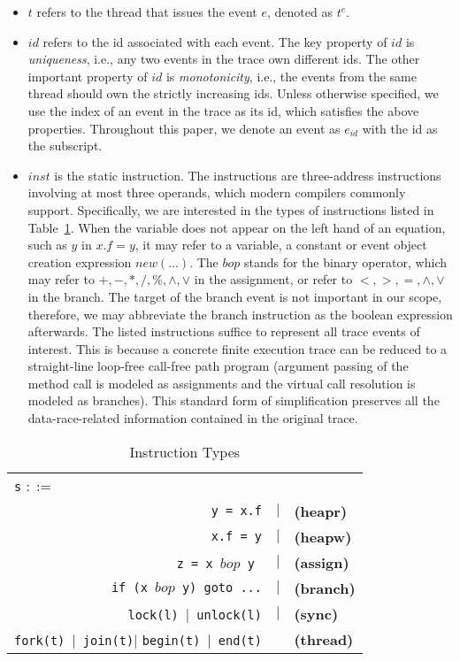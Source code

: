 \begin{itemize}
\item $t$ refers to the thread that issues the event $e$, denoted as $t^e$.
\item  $id$ refers to the id associated with each event. The key property of  $id$ is {\em uniqueness}, i.e., any two events in the trace own different ids. The other important property of $id$ is {\em monotonicity}, i.e.,  the events from the same thread should own the strictly increasing ids. Unless otherwise specified, we use  the index of an event in the trace as its id, which satisfies the above properties. Throughout this paper,  we denote an event as $e_{id}$ with the id as the subscript. %
\item $inst$ is the static instruction. The instructions are three-address instructions involving at most three operands, which modern compilers commonly support.  Specifically, we are interested in the types of instructions listed in Table~\ref{Ta:syntax}. When the variable does not appear on the left hand of an equation, such as $y$ in $x.f=y$, it may refer to a variable, a constant or event object creation expression $new (...)$.  The $bop$ stands for the binary operator, which may refer to $+, -, *, /, \%, \wedge, \vee$ in the assignment, or refer to $<, >, =, \wedge, \vee$ in the branch. The target of the branch event is not important in our scope, therefore, we may abbreviate the branch instruction as the boolean expression afterwards. The listed instructions suffice to represent all trace events of interest. This is because a concrete finite execution trace can be reduced to a straight-line loop-free call-free path program  (argument passing of the method call is modeled as assignments and the virtual call resolution is modeled as branches). This standard form of simplification preserves all the data-race-related information contained in the original trace. 
\end{itemize}



\begin{table}
	\begin{center}
		\begin{tabular}{rcl}
			\multicolumn{1}{l}{{\tt s} $::=$} & & \\
			{\tt y = x.f} & $|$ & {\bf (heapr)} \\ 
			{\tt x.f = y}  & $|$ & {\bf (heapw)} \\ %
			{\tt z = x $bop$ y}\  & $|$ & {\bf (assign)} \\ %
			{\tt if (x $bop$  y) goto ...} & $|$ &  {\bf (branch)} \\
			{\tt lock(l)}\ $|$\ {\tt unlock(l)}  & $|$& {\bf (sync)} \\
			{\tt fork(t)}\ $|$\ {\tt join(t)}$|$ {\tt begin(t)}\ $|$\ {\tt end(t)} &  & {\bf (thread)}
		\end{tabular}
	\end{center}
	\caption{\label{Ta:syntax}Instruction Types}
\end{table}


